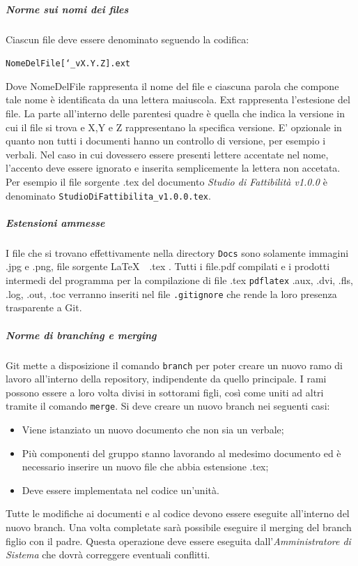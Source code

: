 			\subparagraph{Norme sui nomi dei files} \Spazio
			Ciascun file deve essere denominato seguendo la codifica:
					
					\begin{center}
						\texttt{NomeDelFile[\char`_vX.Y.Z].ext}
					\end{center}
			Dove NomeDelFile rappresenta il nome del file e ciascuna parola che compone tale nome è identificata da una lettera maiuscola. Ext rappresenta l'estesione del file. La parte all'interno delle parentesi quadre è quella che indica la versione in cui il file si trova e X,Y e Z rappresentano la specifica versione. E' opzionale in quanto non tutti i documenti hanno un controllo di versione, per esempio i verbali. Nel caso in cui dovessero essere presenti lettere accentate nel nome, l'accento deve essere ignorato e inserita semplicemente la lettera non accetata. Per esempio il file sorgente .tex del documento \emph{Studio di Fattibilità v1.0.0} è denominato \texttt{StudioDiFattibilita\_v1.0.0.tex}.
			
			\subparagraph{Estensioni ammesse} \Spazio
			I file che si trovano effettivamente nella directory \texttt{Docs} sono solamente immagini .jpg e .png, file sorgente \LaTeX $\text{ }$ .tex . Tutti i file.pdf compilati e i prodotti intermedi del programma per la compilazione di file .tex \texttt{pdflatex} .aux, .dvi, .fls, .log, .out, .toc verranno inseriti nel file \texttt{.gitignore} che rende la loro presenza trasparente a Git.
			
			\subparagraph{Norme di branching e merging} \Spazio
			Git mette a disposizione il comando \texttt{branch} per poter creare un nuovo ramo di lavoro all'interno della repository, indipendente da quello principale. I rami possono essere a loro volta divisi in sottorami figli, così come uniti ad altri tramite il comando \texttt{merge}. Si deve creare un nuovo branch nei seguenti casi:
			\begin{itemize}
				\item Viene istanziato un nuovo documento che non sia un verbale;
				\item Più componenti del gruppo stanno lavorando al medesimo documento ed è necessario inserire un nuovo file che abbia estensione .tex;
				\item Deve essere implementata nel codice un'unità.
			\end{itemize}
			Tutte le modifiche ai documenti e al codice devono essere eseguite all'interno del nuovo branch. Una volta completate sarà possibile eseguire il merging del branch figlio con il padre. Questa operazione deve essere eseguita dall'\emph{Amministratore di Sistema} che dovrà correggere eventuali conflitti.
			
